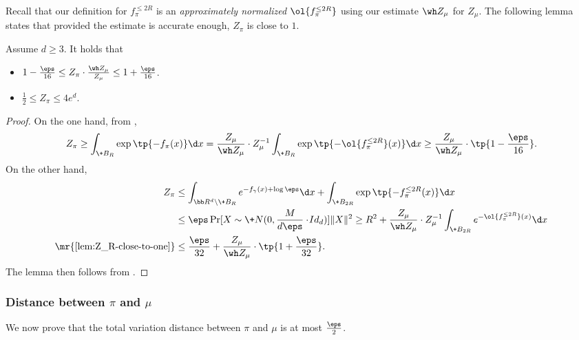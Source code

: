 Recall that our definition for $f^{\le 2R}_{\pi}$ is an \emph{approximately normalized} $\ol{f^{\le 2R}_{\pi}}$ using our estimate $\wh Z_\mu$ for $Z_\mu$. The following lemma states that provided the estimate is accurate enough, $Z_\pi$ is close to $1$.

\begin{lemma}\label{lem:Zpi-close-to-one}
    Assume $d\geq 3$. It holds that
    \begin{itemize}
        \item $1-\frac{\eps}{16} \le Z_\pi \cdot \frac{\wh Z_\mu}{Z_\mu} \le 1+\frac{\eps}{16}$.
        \item $\frac12\le Z_\pi\le 4e^d$.
    \end{itemize}
\end{lemma}
\begin{proof}
    On the one hand, from ,
    \[
        Z_{\pi} \geq \int_{\+B_R} \exp\tp{-f_\pi(x)} \d x = \frac{Z_\mu}{\wh Z_{\mu}} \cdot Z_\mu^{-1}\int_{\+B_R} \exp\tp{-\ol{f^{\le 2R}_\pi}(x)} \d x \geq \frac{Z_\mu}{\wh Z_{\mu}} \cdot \tp{1 - \frac{\eps}{16}}.
    \]
    On the other hand, 
    \begin{align*}
        Z_{\pi} &\leq \int_{\bb R^d\setminus \+B_R} e^{-f_\gamma(x)+\log\eps} \d x + \int_{\+B_{2R}} \exp\tp{-f^{\le 2R}_\pi(x)} \d x\\
        &\le \eps\Pr[X\sim \+N(0,\frac{M}{d\eps}\cdot \!{Id}_d)]{ \|X\|^2 \geq R^2} + \frac{Z_\mu}{\wh Z_{\mu}} \cdot Z_\mu^{-1}\int_{\+B_{2R}} e^{-\ol{f^{\le 2R}_\pi}(x)} \d x \\
        \mr{\Cref{lem:Z_R-close-to-one}}
        &\leq \frac{\eps}{32} + \frac{Z_\mu}{\wh Z_{\mu}} \cdot \tp{1+\frac{\eps}{32}}.
    \end{align*}
    The lemma then follows from .
\end{proof} 

\subsubsection{Distance between $\pi$ and $\mu$}\label{sec:ub-closeness}

We now prove that the total variation distance between $\pi$ and $\mu$ is at most $\frac{\eps}{2}$. 


